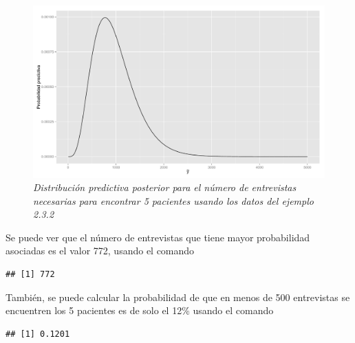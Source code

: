 \begin{Eje}
    \begin{figure}[!htb]\label{jefber}
    \centering
    \includegraphics[scale=0.35]{pred_negabinom.pdf}
    \caption{\emph{Distribuci\'on predictiva posterior para el n\'umero de entrevistas necesarias para encontrar 5 pacientes usando los datos del ejemplo 2.3.2}}
    \end{figure}
    
    Se puede ver que el n\'umero de entrevistas que tiene mayor probabilidad asociadas es el valor 772, usando el comando
\begin{knitrout}
\color{fgcolor}\begin{kframe}
\begin{alltt}
\hlopt{==}\hlopt{+}
\end{alltt}
\begin{verbatim}
## [1] 772
\end{verbatim}
\end{kframe}
\end{knitrout}
    Tambi\'en, se puede calcular la probabilidad de que en menos de 500 entrevistas se encuentren los 5 pacientes es de solo el 12\% usando el comando
\begin{knitrout}
\color{fgcolor}\begin{kframe}
\begin{alltt}
\hlstd{(fun[}\hlopt{:}\hlstd{(}\hlopt{-}\hlstd{)])}
\end{alltt}
\begin{verbatim}
## [1] 0.1201
\end{verbatim}
\end{kframe}
\end{knitrout}
    \end{Eje}
    
